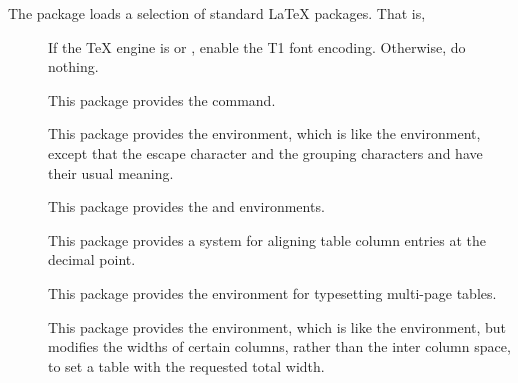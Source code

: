 \documentclass{scrartcl}
\begin{document}
The  package loads a selection of standard \LaTeX{}
packages.  That is,
\begin{description}
\item[\href{https://mirrors.ctan.org/macros/latex/base/encguide.pdf}{}]
If the \TeX{} engine is  or , enable the
T1 font encoding.  Otherwise, do nothing.

\item[\href{https://mirrors.ctan.org/macros/latex/base/ifthen.pdf}{}]
This package provides the \symb{\ifthenelse} command.

\item[\href{https://mirrors.ctan.org/macros/latex/base/alltt.pdf}{}]
This package provides the  environment, which is like the
 environment, except that the escape character \code{\\}
and the grouping characters \code{\{} and \code{\}} have their usual
meaning.

\item[\href{https://mirrors.ctan.org/macros/latex/required/tools/array.pdf}{}]
This package provides the  and  environments.

\item[\href{https://mirrors.ctan.org/macros/latex/required/tools/dcolumn.pdf}{}]
This package provides a system for aligning table column entries at
the decimal point.

\item[\href{https://mirrors.ctan.org/macros/latex/required/tools/longtable.pdf}{}]
This package provides the  environment for typesetting
multi-page tables.

\item[\href{https://mirrors.ctan.org/macros/latex/required/tools/tabularx.pdf}{}]
This package provides the  environment, which is like
the  environment, but modifies the widths of certain
columns, rather than the inter column space, to set a table with the
requested total width.


\end{description}
\end{document}
